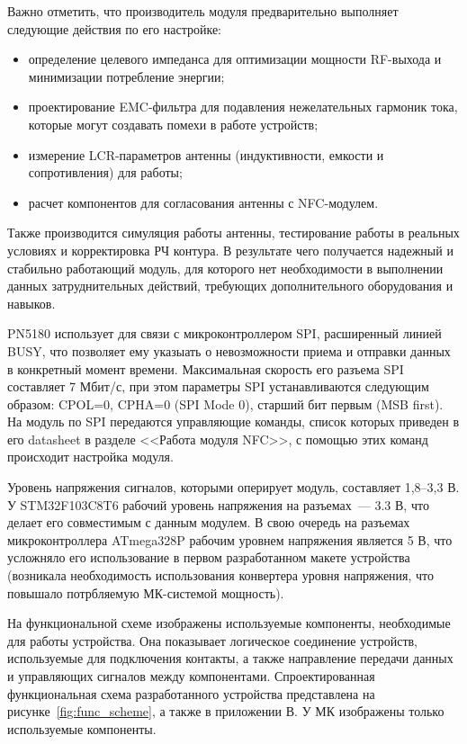 Важно отметить, что производитель модуля предварительно выполняет следующие действия по его настройке:
\begin{itemize}
    \item определение целевого импеданса для оптимизации мощности RF-выхода и минимизации потребление энергии;
    \item проектирование EMC-фильтра для подавления нежелательных гармоник тока, которые могут создавать помехи в работе устройств;
    \item измерение LCR-параметров антенны (индуктивности, емкости и сопротивления) для работы;
    \item расчет компонентов для согласования антенны с NFC-модулем.
\end{itemize}

Также производится симуляция работы антенны, тестирование работы в реальных условиях и корректировка РЧ контура.
В результате чего получается надежный и стабильно работающий модуль, для которого нет необходимости в выполнении данных затруднительных действий, требующих дополнительного оборудования и навыков.


PN5180 использует для связи с микроконтроллером SPI, расширенный линией BUSY, что позволяет ему указыать о невозможности приема и отправки данных в конкретный момент времени.
Максимальная скорость его разъема SPI составляет 7 Мбит/с, при этом параметры SPI устанавливаются следующим образом: CPOL=0, CPHA=0 (SPI Mode 0), старший бит первым (MSB first).
На модуль по SPI передаются управляющие команды, список которых приведен в его datasheet в разделе <<Работа модуля NFC>>, с помощью этих команд происходит настройка модуля\cite{pn5180_datasheet}.

Уровень напряжения сигналов, которыми оперирует модуль, составляет 1,8--3,3 В.
У STM32F103C8T6 рабочий уровень напряжения на разъемах~--- 3.3 В, что делает его совместимым с данным модулем.
В свою очередь на разъемах микроконтроллера ATmega328P рабочим уровнем напряжения является 5 В, что усложняло его использование в первом разработанном макете устройства (возникала необходимость использования конвертера уровня напряжения, что повышало потрбляемую МК-системой мощность).


На функциональной схеме изображены используемые компоненты, необходимые для работы устройства.
Она показывает логическое соединение устройств, используемые для подключения контакты, а также направление передачи данных и управляющих сигналов между компонентами.
Спроектированная функциональная схема разработанного устройства представлена на рисунке~\ref{fig:func_scheme}, а также в приложении В.
У МК изображены только используемые компоненты.

